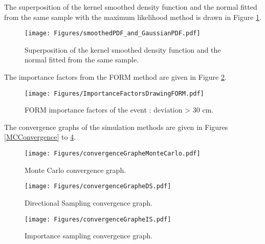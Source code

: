 \documentclass[11pt]{article}
\begin{document}
The superposition of the kernel smoothed density function and the normal fitted from the same sample with the maximum likelihood method is drawn in Figure \ref{superp}.


\begin{figure}[Hhbtp]
  \begin{center}
    \texttt{[image: Figures/smoothedPDF\_and\_GaussianPDF.pdf]}
  \end{center}
  \caption{Superposition of the kernel smoothed density function and the normal fitted from the same sample.}
  \label{superp}
\end{figure}

The importance factors from the FORM method are given in Figure \ref{FormIF}.

\begin{figure}[Hhbtp]
  \begin{center}
    \texttt{[image: Figures/ImportanceFactorsDrawingFORM.pdf]}
  \end{center}
  \caption{FORM importance factors of the event : deviation > 30 cm.}
  \label{FormIF}
\end{figure}

The convergence graphs of the simulation methods are given in Figures \ref{MCConvergence} to \ref{ISConvergence}.


\begin{figure}[Hhbtp]
  \begin{minipage}{9.8cm}
    \begin{center}
      \texttt{[image: Figures/convergenceGrapheMonteCarlo.pdf]}
      \caption{Monte Carlo convergence graph.}
      \label{MCConvergence}
    \end{center}
  \end{minipage}
  \hfill
  \begin{minipage}{9.8cm}
    \begin{center}
      \texttt{[image: Figures/convergenceGrapheDS.pdf]}
      \caption{Directional Sampling convergence graph.}
      \label{DSConvergence}
    \end{center}
  \end{minipage}
\end{figure}




\begin{figure}[Hhbtp]
  \begin{minipage}{9.8cm}
    \begin{center}
      \texttt{[image: Figures/convergenceGrapheIS.pdf]}
      \caption{Importance sampling convergence graph.}
      \label{ISConvergence}
    \end{center}
  \end{minipage}
\end{figure}
\end{document}
